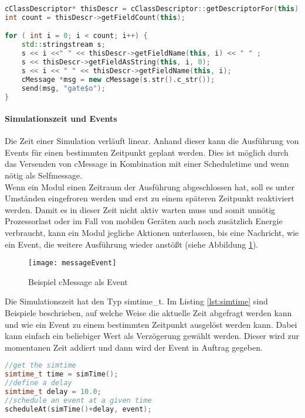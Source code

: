 \begin{minipage}{\textwidth}
\begin{lstlisting}[language=C++,caption={Verwendung von cClassDescriptor },label=lst:cclassdescriptor]
cClassDescriptor* thisDescr = cClassDescriptor::getDescriptorFor(this);
int count = thisDescr->getFieldCount(this);

for ( int i = 0; i < count; i++) {
    std::stringstream s;
    s << i <<" " << thisDescr->getFieldName(this, i) << " " ;
    s << thisDescr->getFieldAsString(this, i, 0);
    s << i << " " << thisDescr->getFieldName(this, i);
    cMessage *msg = new cMessage(s.str().c_str());
    send(msg, "gate$o");
}
\end{lstlisting}
\end{minipage}

\paragraph{Simulationszeit und Events}

Die Zeit einer Simulation verläuft linear. Anhand dieser kann die Ausführung von Events für einen bestimmten Zeitpunkt geplant werden. Dies ist möglich durch das Versenden von cMessage in Kombination mit einer Scheduletime und wenn nötig als Selfmessage.\\
Wenn ein Modul einen Zeitraum der Ausführung abgeschlossen hat, soll es unter Umständen eingefroren werden und erst zu einem späteren Zeitpunkt reaktiviert werden. Damit es in dieser Zeit nicht aktiv warten muss und somit unnötig Prozessorlast oder im Fall von mobilen Geräten auch noch zusätzlich Energie verbraucht, kann ein Modul jegliche Aktionen unterlassen, bis eine Nachricht, wie ein Event, die weitere Ausführung wieder anstößt (siehe Abbildung \ref{fig:messageEvent}). 

\begin{figure}[htbp]
\centering
\caption{Beispiel cMessage als Event}
\label{fig:messageEvent}
\texttt{[image: messageEvent]}
\end{figure}

Die Simulationszeit hat den Typ simtime\_t. Im Listing \ref{lst:simtime} sind Beispiele beschrieben, auf welche Weise die aktuelle Zeit abgefragt werden kann und wie ein Event zu einem bestimmten Zeitpunkt ausgelöst werden kann. Dabei kann einfach ein beliebiger Wert als Verzögerung gewählt werden. Dieser wird zur momentanen Zeit addiert und dann wird der Event in Auftrag gegeben.

\begin{minipage}{\textwidth}
\begin{lstlisting}[language=C++,caption={Simulationszeit und Event},label=lst:simtime]
//get the simtime
simtime_t time = simTime();
//define a delay
simtime_t delay = 10.0;
//schedule an event at a given time
scheduleAt(simTime()+delay, event);
\end{lstlisting}
\end{minipage}

